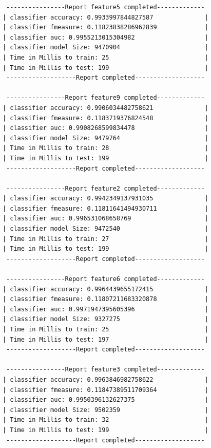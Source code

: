 \documentclass[a4paper,11pt]{scrreprt}
\begin{document}
\begin{verbatim}
			 ----------------Report feature5 completed-------------
			| classifier accuracy: 0.9933997844827587              |
			| classifier fmeasure: 0.11823838286962839             |
			| classifier auc: 0.9955213015304982                   |
			| classifier model Size: 9470904                       |
			| Time in Millis to train: 25                          |
			| Time in Millis to test: 199                          |
			 -------------------Report completed-------------------
			 
			 ----------------Report feature9 completed-------------
			| classifier accuracy: 0.9906034482758621              |
			| classifier fmeasure: 0.1183719376824548              |
			| classifier auc: 0.9908268599834478                   |
			| classifier model Size: 9479764                       |
			| Time in Millis to train: 28                          |
			| Time in Millis to test: 199                          |
			 -------------------Report completed-------------------
			 
			 ----------------Report feature2 completed-------------
			| classifier accuracy: 0.9942349137931035              |
			| classifier fmeasure: 0.11811641494930711             |
			| classifier auc: 0.996531068658769                    |
			| classifier model Size: 9472540                       |
			| Time in Millis to train: 27                          |
			| Time in Millis to test: 199                          |
			 -------------------Report completed-------------------

			 ----------------Report feature6 completed-------------
			| classifier accuracy: 0.9964439655172415              |
			| classifier fmeasure: 0.11807211683320878             |
			| classifier auc: 0.9971947395605396                   |
			| classifier model Size: 9327275                       |
			| Time in Millis to train: 25                          |
			| Time in Millis to test: 197                          |
			 -------------------Report completed-------------------
			 
			 ----------------Report feature3 completed-------------
			| classifier accuracy: 0.9963846982758622              |
			| classifier fmeasure: 0.11847389511709364             |
			| classifier auc: 0.9950396132627375                   |
			| classifier model Size: 9502359                       |
			| Time in Millis to train: 32                          |
			| Time in Millis to test: 199                          |
			 -------------------Report completed-------------------
			 

\end{verbatim}
\end{document}
